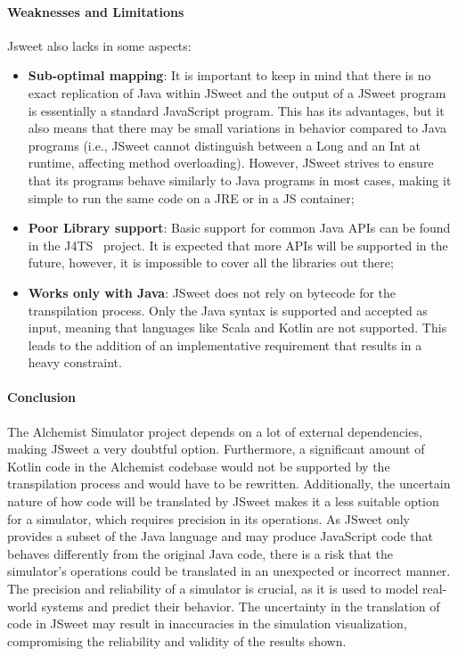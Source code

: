 \paragraph{Weaknesses and Limitations} Jsweet also lacks in some aspects:
\begin{itemize}
	\item \textbf{Sub-optimal mapping}: It is important to keep in mind that there is no exact replication of Java within JSweet and the output of a JSweet program is essentially a standard JavaScript program. This has its advantages, but it also means that there may be small variations in behavior compared to Java programs (i.e., JSweet cannot distinguish between a Long and an Int at runtime, affecting method overloading). However, JSweet strives to ensure that its programs behave similarly to Java programs in most cases, making it simple to run the same code on a JRE or in a JS container;
	\item \textbf{Poor Library support}: Basic support for common Java APIs can be found in the J4TS~\cite{j4tsj4ts87:online} project. It is expected that more APIs will be supported in the future, however, it is impossible to cover all the libraries out there;
	\item \textbf{Works only with Java}: JSweet does not rely on bytecode for the transpilation process. Only the Java syntax is supported and accepted as input, meaning that languages like Scala and Kotlin are not supported. This leads to the addition of an implementative requirement that results in a heavy constraint.
\end{itemize}

\paragraph{Conclusion} The Alchemist Simulator project depends on a lot of external dependencies, making JSweet a very doubtful option. Furthermore, a significant amount of Kotlin code in the Alchemist codebase would not be supported by the transpilation process and would have to be rewritten. Additionally, the uncertain nature of how code will be translated by JSweet makes it a less suitable option for a simulator, which requires precision in its operations. As JSweet only provides a subset of the Java language and may produce JavaScript code that behaves differently from the original Java code, there is a risk that the simulator's operations could be translated in an unexpected or incorrect manner. The precision and reliability of a simulator is crucial, as it is used to model real-world systems and predict their behavior. The uncertainty in the translation of code in JSweet may result in inaccuracies in the simulation visualization, compromising the reliability and validity of the results shown.\newline

